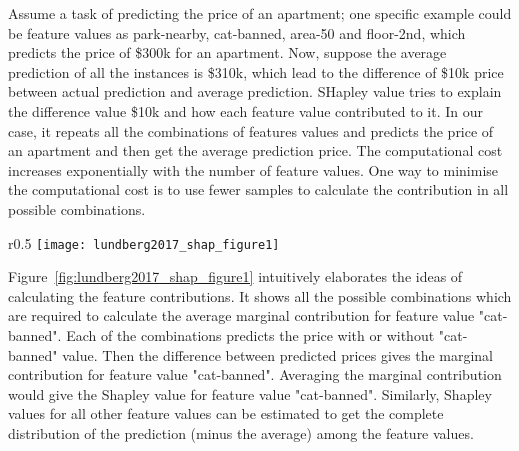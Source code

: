 \documentclass[english]{tktltiki2}
\theoremstyle{definition}
\theoremstyle{remark}
\begin{document}
Assume a task of predicting the price of an apartment; one specific example could be feature values as park-nearby, cat-banned, area-50 and floor-2nd, which predicts the price of \$300k for an apartment. Now, suppose the average prediction of all the instances is \$310k, which lead to the difference of \$10k price between actual prediction and average prediction. SHapley value tries to explain the difference value \$10k  and how each feature value contributed to it. In our case, it repeats all the combinations of features values and predicts the price of an apartment and then get the average prediction price. The computational cost increases exponentially with the number of feature values. One way to minimise the computational cost is to use fewer samples to calculate the contribution in all possible combinations.

\begin{wrapfigure}{r}{0.5\textwidth}
	\centering
	\vspace*{-2mm}
	\texttt{[image: lundberg2017\_shap\_figure1]}
	\vspace*{-10mm}
	\caption{SHapley value: \citep{molnarinterpretable}: All 8 combinations require to compute the Shapley value for feature value = "cat-banned".}
	\label{fig:lundberg2017_shap_figure1}
\end{wrapfigure}


Figure~\ref{fig:lundberg2017_shap_figure1} intuitively elaborates the ideas of calculating the feature contributions. It shows all the possible combinations which are required to calculate the average marginal contribution for feature value "cat-banned". Each of the combinations predicts the price with or without "cat-banned" value. Then the difference between predicted prices gives the marginal contribution for feature value "cat-banned".  Averaging the marginal contribution would give the Shapley value for feature value "cat-banned".  Similarly, Shapley values for all other feature values can be estimated to get the complete distribution of the prediction (minus the average) among the feature values.
\end{document}
